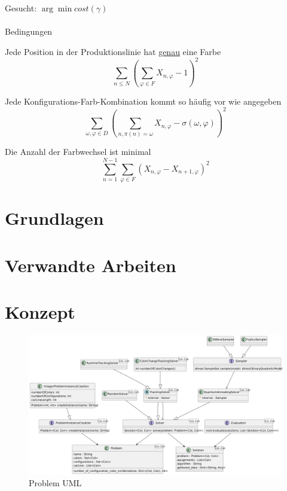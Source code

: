 \noindent Gesucht: $\arg\min {cost(\gamma)}$\\
\\
\noindent Bedingungen

Jede Position in der Produktionslinie hat \underline{genau} eine Farbe 
\begin{equation}
\displaystyle\sum_{n\leq N}\left(\sum_{\varphi\in F} X_{n,\varphi} - 1\right)^2
\end{equation}

Jede Konfigurations-Farb-Kombination kommt so häufig vor wie angegeben 
\begin{equation}
\displaystyle\sum_{\omega,\varphi\in D}\left ({\sum_{n,\pi(n)=\omega} X_{n,\varphi}} - \sigma(\omega,\varphi)\right )^2
\end{equation}

Die Anzahl der Farbwechsel ist minimal
\begin{equation}
\displaystyle\sum_{n=1}^{N-1} \sum_{\varphi\in F} (X_{n,\varphi} -X_{n+1,\varphi})^2
\end{equation}

\section{Grundlagen}
\label{sec:basics}

\section{Verwandte Arbeiten}
\label{sec:related}


\section{Konzept}
\label{sec:concept}

\begin{figure}[h]
 \includegraphics[width=\linewidth]{./images/problem.png}
 \caption{Problem UML}
 \label{fig:uml1}
\end{figure}

